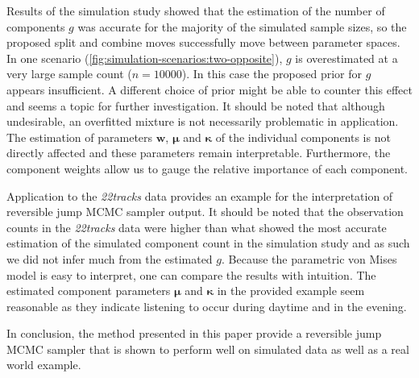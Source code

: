 Results of the simulation study showed that the estimation of the number of components $g$ was accurate for the majority of the simulated sample sizes, so the proposed split and combine moves successfully move between parameter spaces. In one scenario (\ref{fig:simulation-scenarios:two-opposite}), $g$ is overestimated at a very large sample count ($n=10000$). In this case the proposed prior for $g$ appears insufficient. A different choice of prior might be able to counter this effect and seems a topic for further investigation. It should be noted that although undesirable, an overfitted mixture is not necessarily problematic in application. The estimation of parameters $\bm w$, $\bm \mu$ and $\bm \kappa$ of the individual components is not directly affected and these parameters remain interpretable. Furthermore, the component weights allow us to gauge the relative importance of each component.


Application to the \textit{22tracks} data provides an example for the interpretation of reversible jump MCMC sampler output. It should be noted that the observation counts in the \textit{22tracks} data were higher than what showed the most accurate estimation of the simulated component count in the simulation study and as such we did not infer much from the estimated $g$. Because the parametric von Mises model is easy to interpret, one can compare the results with intuition. The estimated component parameters $\bm \mu$ and $\bm \kappa$ in the provided example seem reasonable as they indicate listening to occur during daytime and in the evening. 


In conclusion, the method presented in this paper provide a reversible jump MCMC sampler that is shown to perform well on simulated data as well as a real world example.


